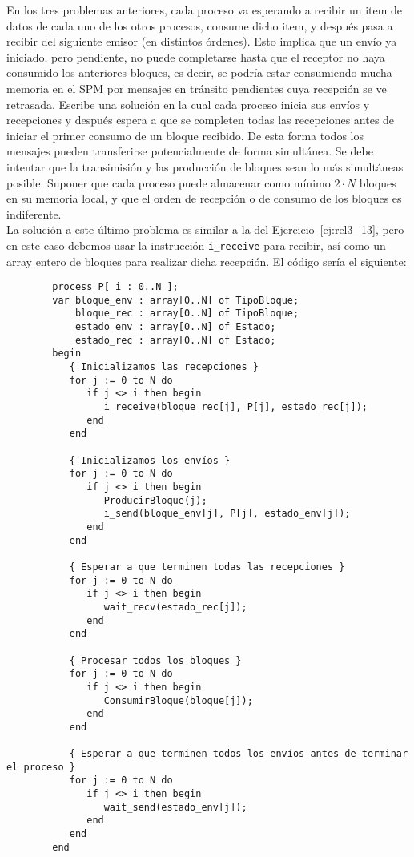 \begin{ejercicio}\label{ej:rel3_14}
    En los tres problemas anteriores, cada proceso va esperando a recibir un item de datos de cada uno de los otros procesos, consume dicho item, y después pasa a recibir del siguiente emisor (en distintos órdenes). Esto implica que un envío ya iniciado, pero pendiente, no puede completarse hasta que el receptor no haya consumido los anteriores bloques, es decir, se podría estar consumiendo mucha memoria en el SPM por mensajes en tránsito pendientes cuya recepción se ve retrasada. Escribe una solución en la cual cada proceso inicia sus envíos y recepciones y después espera a que se completen todas las recepciones antes de iniciar el primer consumo de un bloque recibido. De esta forma todos los mensajes pueden transferirse potencialmente de forma simultánea. Se debe intentar que la transimisión y las producción de bloques sean lo más simultáneas posible. Suponer que cada proceso puede almacenar como mínimo $2\cdot N$ bloques en su memoria local, y que el orden de recepción o de consumo de los bloques es indiferente.\\

    La solución a este último problema es similar a la del Ejercicio~\ref{ej:rel3_13}, pero en este caso debemos usar la instrucción \verb|i_receive| para recibir, así como un array entero de bloques para realizar dicha recepción. El código sería el siguiente:
    \begin{verbatim}
        process P[ i : 0..N ];
        var bloque_env : array[0..N] of TipoBloque;
            bloque_rec : array[0..N] of TipoBloque;
            estado_env : array[0..N] of Estado;
            estado_rec : array[0..N] of Estado;
        begin
           { Inicializamos las recepciones }
           for j := 0 to N do
              if j <> i then begin
                 i_receive(bloque_rec[j], P[j], estado_rec[j]);
              end
           end

           { Inicializamos los envíos }
           for j := 0 to N do
              if j <> i then begin
                 ProducirBloque(j);
                 i_send(bloque_env[j], P[j], estado_env[j]);
              end
           end

           { Esperar a que terminen todas las recepciones }
           for j := 0 to N do
              if j <> i then begin
                 wait_recv(estado_rec[j]);
              end
           end

           { Procesar todos los bloques }
           for j := 0 to N do
              if j <> i then begin
                 ConsumirBloque(bloque[j]);
              end
           end

           { Esperar a que terminen todos los envíos antes de terminar el proceso }
           for j := 0 to N do
              if j <> i then begin
                 wait_send(estado_env[j]);
              end
           end
        end
    \end{verbatim}
\end{ejercicio}
